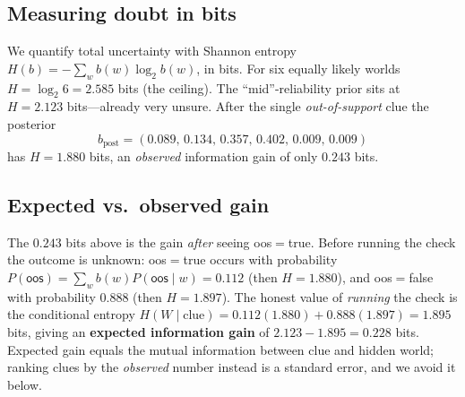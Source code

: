 \documentclass[11pt]{article}
\begin{document}
\subsection{Measuring doubt in bits}
We quantify total uncertainty with Shannon entropy $H(b)=-\sum_w b(w)\log_2 b(w)$,
in bits. For six equally likely worlds $H=\log_2 6=2.585$ bits (the ceiling). The
``mid''-reliability prior sits at $H=2.123$ bits---already very unsure. After the
single \emph{out-of-support} clue the posterior
\[
b_{\text{post}}=(0.089,\,0.134,\,0.357,\,0.402,\,0.009,\,0.009)
\]
has $H=1.880$ bits, an \emph{observed} information gain of only $0.243$ bits.

\begin{center}
\label{fig:entropy}
\end{center}

\subsection{Expected vs.\ observed gain}
The $0.243$ bits above is the gain \emph{after} seeing \textsf{oos}$=$true. Before
running the check the outcome is unknown: \textsf{oos}$=$true occurs with probability
$P(\textsf{oos})=\sum_w b(w)P(\textsf{oos}\mid w)=0.112$ (then $H=1.880$), and
\textsf{oos}$=$false with probability $0.888$ (then $H=1.897$). The honest value of
\emph{running} the check is the conditional entropy
$H(W\mid \text{clue})=0.112(1.880)+0.888(1.897)=1.895$ bits, giving an
\textbf{expected information gain} of $2.123-1.895=0.228$ bits. Expected gain equals
the mutual information between clue and hidden world; ranking clues by the
\emph{observed} number instead is a standard error, and we avoid it below.
\end{document}
